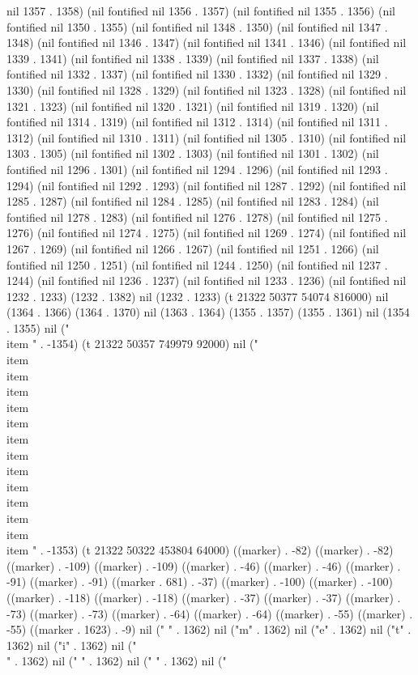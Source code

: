 nil 1357 . 1358) (nil fontified nil 1356 . 1357) (nil fontified nil 1355 . 1356) (nil fontified nil 1350 . 1355) (nil fontified nil 1348 . 1350) (nil fontified nil 1347 . 1348) (nil fontified nil 1346 . 1347) (nil fontified nil 1341 . 1346) (nil fontified nil 1339 . 1341) (nil fontified nil 1338 . 1339) (nil fontified nil 1337 . 1338) (nil fontified nil 1332 . 1337) (nil fontified nil 1330 . 1332) (nil fontified nil 1329 . 1330) (nil fontified nil 1328 . 1329) (nil fontified nil 1323 . 1328) (nil fontified nil 1321 . 1323) (nil fontified nil 1320 . 1321) (nil fontified nil 1319 . 1320) (nil fontified nil 1314 . 1319) (nil fontified nil 1312 . 1314) (nil fontified nil 1311 . 1312) (nil fontified nil 1310 . 1311) (nil fontified nil 1305 . 1310) (nil fontified nil 1303 . 1305) (nil fontified nil 1302 . 1303) (nil fontified nil 1301 . 1302) (nil fontified nil 1296 . 1301) (nil fontified nil 1294 . 1296) (nil fontified nil 1293 . 1294) (nil fontified nil 1292 . 1293) (nil fontified nil 1287 . 1292) (nil fontified nil 1285 . 1287) (nil fontified nil 1284 . 1285) (nil fontified nil 1283 . 1284) (nil fontified nil 1278 . 1283) (nil fontified nil 1276 . 1278) (nil fontified nil 1275 . 1276) (nil fontified nil 1274 . 1275) (nil fontified nil 1269 . 1274) (nil fontified nil 1267 . 1269) (nil fontified nil 1266 . 1267) (nil fontified nil 1251 . 1266) (nil fontified nil 1250 . 1251) (nil fontified nil 1244 . 1250) (nil fontified nil 1237 . 1244) (nil fontified nil 1236 . 1237) (nil fontified nil 1233 . 1236) (nil fontified nil 1232 . 1233) (1232 . 1382) nil (1232 . 1233) (t 21322 50377 54074 816000) nil (1364 . 1366) (1364 . 1370) nil (1363 . 1364) (1355 . 1357) (1355 . 1361) nil (1354 . 1355) nil (" \\item " . -1354) (t 21322 50357 749979 92000) nil (" 
  \\item
  \\item 
  \\item 
  \\item 
  \\item 
  \\item 
  \\item 
  \\item 
  \\item 
  \\item 
  \\item 
  \\item 
  \\item 
" . -1353) (t 21322 50322 453804 64000) ((marker) . -82) ((marker) . -82) ((marker) . -109) ((marker) . -109) ((marker) . -46) ((marker) . -46) ((marker) . -91) ((marker) . -91) ((marker . 681) . -37) ((marker) . -100) ((marker) . -100) ((marker) . -118) ((marker) . -118) ((marker) . -37) ((marker) . -37) ((marker) . -73) ((marker) . -73) ((marker) . -64) ((marker) . -64) ((marker) . -55) ((marker) . -55) ((marker . 1623) . -9) nil (" " . 1362) nil ("m" . 1362) nil ("e" . 1362) nil ("t" . 1362) nil ("i" . 1362) nil ("\\" . 1362) nil (" " . 1362) nil (" " . 1362) nil (" 
